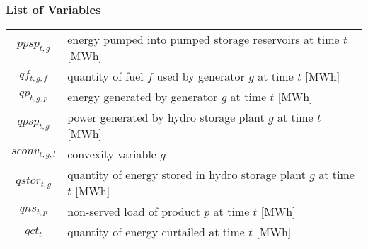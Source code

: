 \documentclass[preprint, 12pt, authoryear]{elsarticle}
\begin{document}
\subsubsection{List of Variables}
\begin{tabular}{c l}
$ppsp_{t,g}$ & \makecell[l]{energy pumped into pumped storage reservoirs at \\time $t$ [MWh]} \\
$qf_{t,g,f}$ & quantity of fuel $f$ used by generator $g$ at time $t$ [MWh]\\
$qp_{t,g,p}$ & energy generated by generator $g$ at time $t$ [MWh]\\
$qpsp_{t,g}$ & power generated by hydro storage plant $g$ at time $t$ [MWh]\\
$sconv_{t,g,l}$ & convexity variable $g$\\
$qstor_{t,g}$ & \makecell[l]{quantity of energy stored in hydro storage plant $g$ at \\time $t$ [MWh]}\\
$qns_{t,p}$ & non-served load of product $p$ at time $t$ [MWh]\\
$qct_{t}$ & quantity of energy curtailed at time $t$ [MWh]\\
\end{tabular}
\end{document}
